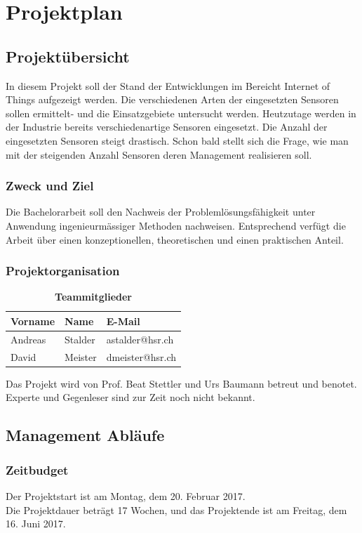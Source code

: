\chapter{Projektplan}
\section{Projektübersicht}
In diesem Projekt soll der Stand der Entwicklungen im Bereicht \glqq Internet of Things\grqq{} aufgezeigt werden. Die verschiedenen Arten der eingesetzten Sensoren sollen ermittelt- und die Einsatzgebiete untersucht werden. Heutzutage werden in der Industrie bereits verschiedenartige Sensoren eingesetzt. Die Anzahl der eingesetzten Sensoren steigt drastisch. Schon bald stellt sich die Frage, wie man mit der steigenden Anzahl Sensoren deren Management realisieren soll.
\subsection{Zweck und Ziel}
Die Bachelorarbeit soll den Nachweis der Problemlösungsfähigkeit unter Anwendung
ingenieurmässiger Methoden nachweisen. Entsprechend verfügt die Arbeit über einen
konzeptionellen, theoretischen und einen praktischen Anteil.
\subsection{Projektorganisation}
\begin{table}[H]
\centering
    \begin{tabular}{@{} l l l@{}}    
    {Vorname} & {Name} & {E-Mail} \\ \midrule
    Andreas & Stalder & astalder@hsr.ch \\ \addlinespace
    David & Meister & dmeister@hsr.ch \\ \bottomrule
    \end{tabular}
\caption{\textbf{Teammitglieder}}
\end{table} 

Das Projekt wird von Prof. Beat Stettler und Urs Baumann betreut und benotet. Experte und Gegenleser sind zur Zeit noch nicht bekannt.
\section{Management Abläufe}
\subsection{Zeitbudget}
Der Projektstart ist am Montag, dem 20. Februar 2017. \\
Die Projektdauer beträgt 17 Wochen, und das Projektende ist am Freitag, dem 16. Juni 2017. \\

